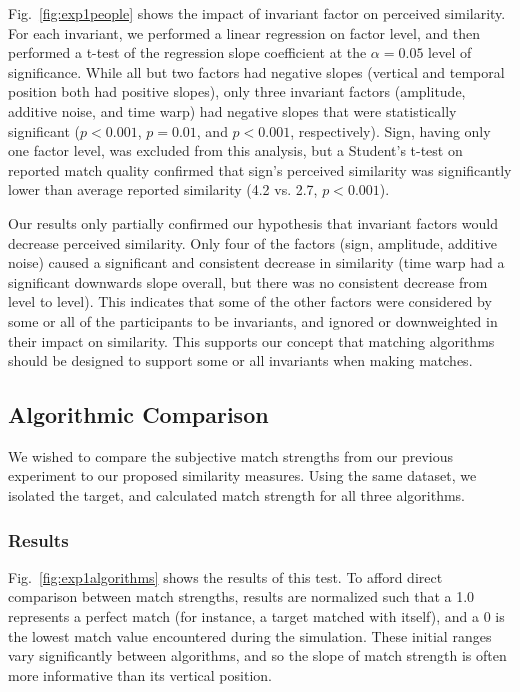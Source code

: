 Fig.~\ref{fig:exp1people} shows the impact of invariant factor on perceived similarity. For each invariant, we performed a linear regression on factor level, and then performed a t-test of the regression slope coefficient at the $\alpha=0.05$ level of significance. While all but two factors had negative slopes (vertical and temporal position both had positive slopes), only three invariant factors (amplitude, additive noise, and time warp) had negative slopes that were statistically significant ($p<0.001$, $p=0.01$, and $p<0.001$, respectively). Sign, having only one factor level, was excluded from this analysis, but a Student's t-test on reported match quality confirmed that sign's perceived similarity was significantly lower than average reported similarity (4.2 vs. 2.7, $p<0.001$).  

Our results only partially confirmed our hypothesis that invariant factors would decrease perceived similarity. Only four of the factors (sign, amplitude, additive noise) caused a significant and consistent decrease in similarity (time warp had a significant downwards slope overall, but there was no consistent decrease from level to level). This indicates that some of the other factors were considered by some or all of the participants to be invariants, and ignored or downweighted in their impact on similarity. This supports our concept that matching algorithms should be designed to support some or all invariants when making matches.  


\subsection{Algorithmic Comparison}

We wished to compare the subjective match strengths from our previous experiment to our proposed similarity measures. Using the same dataset, we isolated the target, and calculated match strength for all three algorithms.

\subsubsection{Results}

Fig.~\ref{fig:exp1algorithms} shows the results of this test. To afford direct comparison between match strengths, results are normalized such that a 1.0 represents a perfect match (for instance, a target matched with itself), and a 0 is the lowest match value encountered during the simulation. These initial ranges vary significantly between algorithms, and so the slope of match strength is often more informative than its vertical position.

